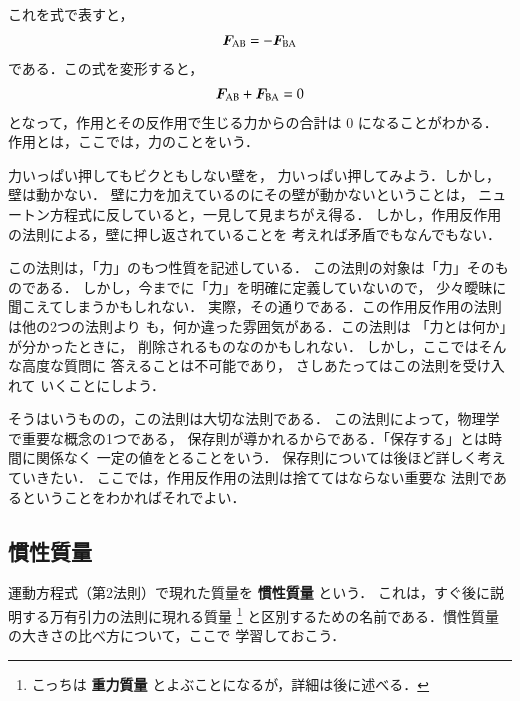             これを式で表すと，
                \begin{align}
                    \boldsymbol{F}_{\mathrm{AB}} = -\boldsymbol{F}_{\mathrm{BA}}
                \end{align}
            である．この式を変形すると，
                \begin{align}
                    \boldsymbol{F}_{\mathrm{AB}} +\boldsymbol{F}_{\mathrm{BA}}= 0
                \end{align}
            となって，作用とその反作用で生じる力からの合計は 0 になることがわかる．
            作用とは，ここでは，力のことをいう．

            力いっぱい押してもビクともしない壁を，
            力いっぱい押してみよう．しかし，壁は動かない．
            壁に力を加えているのにその壁が動かないということは，
            ニュートン方程式に反していると，一見して見まちがえ得る．
            しかし，作用反作用の法則による，壁に押し返されていることを
            考えれば矛盾でもなんでもない．

            この法則は，「力」のもつ性質を記述している．
            この法則の対象は「力」そのものである．
            しかし，今までに「力」を明確に定義していないので，
            少々曖昧に聞こえてしまうかもしれない．
            実際，その通りである．この作用反作用の法則は他の2つの法則より
            も，何か違った雰囲気がある．この法則は
            「力とは何か」が分かったときに，
            削除されるものなのかもしれない．
            しかし，ここではそんな高度な質問に
            答えることは不可能であり，
            さしあたってはこの法則を受け入れて
            いくことにしよう．

            そうはいうものの，この法則は大切な法則である．
            この法則によって，物理学で重要な概念の1つである，
            保存則が導かれるからである．「保存する」とは時間に関係なく
            一定の値をとることをいう．
            保存則については後ほど詳しく考えていきたい．
            ここでは，作用反作用の法則は捨ててはならない重要な
            法則であるということをわかればそれでよい．

        \subsection{慣性質量}
                運動方程式（第2法則）で現れた質量を \textbf{慣性質量} という．
                これは，すぐ後に説明する万有引力の法則に現れる質量
                    \footnote{
                        こっちは \textbf{重力質量} とよぶことになるが，詳細は後に述べる．
                    }
                と区別するための名前である．慣性質量の大きさの比べ方について，ここで
                学習しておこう．

